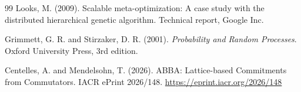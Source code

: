 \documentclass[11pt,a4paper]{article}
\begin{document}
\begin{thebibliography}{99}
Looks, M. (2009).
Scalable meta-optimization: A case study with the distributed hierarchical genetic algorithm.
Technical report, Google Inc.

Grimmett, G. R. and Stirzaker, D. R. (2001).
\textit{Probability and Random Processes}.
Oxford University Press, 3rd edition.

Centelles, A. and Mendelsohn, T. (2026).
ABBA: Lattice-based Commitments from Commutators.
IACR ePrint 2026/148.
\url{https://eprint.iacr.org/2026/148}

\fussy
\end{thebibliography}
\end{document}
